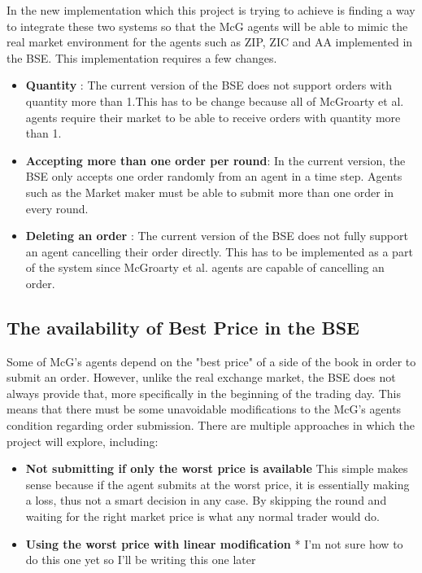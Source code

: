 \documentclass{article}
\begin{document}
In the new implementation which this project is trying to achieve is finding a way to integrate these two systems so that the McG agents will be able to mimic the real market environment for the agents such as ZIP, ZIC and AA implemented in the BSE. This implementation requires a few changes.

\begin{itemize}
    \item  \textbf{Quantity} : The current version of the BSE does not support orders with quantity more than 1.This has to be change because all of McGroarty et al. agents require their market to be able to receive orders with quantity more than 1. 
    \item  \textbf{Accepting more than one order per round}: In the current version, the BSE only accepts one order randomly from an agent in a time step. Agents such as the Market maker must be able to submit more than one order in every round. 
    \item \textbf{Deleting an order} : The current version of the BSE does not fully support an agent cancelling their order directly. This has to be implemented as a part of the system since McGroarty et al. agents are capable of cancelling an order.
\end{itemize} 

\subsection{The availability of Best Price in the BSE}
Some of McG's agents depend on the "best price" of a side of the book in order to submit an order. However, unlike the real exchange market, the BSE does not always provide that, more specifically in the beginning of the trading day. This means that there must be some unavoidable modifications to the McG's agents condition regarding order submission. There are multiple approaches in which the project will explore, including:

\begin{itemize}
    \item \textbf{Not submitting if only the worst price is available} This simple makes sense because if the agent submits at the worst price, it is essentially making a loss, thus not a smart decision in any case. By skipping the round and waiting for the right market price is what any normal trader would do. 
    
    \item \textbf{Using the worst price with linear modification} * I'm not sure how to do this one yet so I'll be writing this one later 
\end{itemize} 

\end{document}
